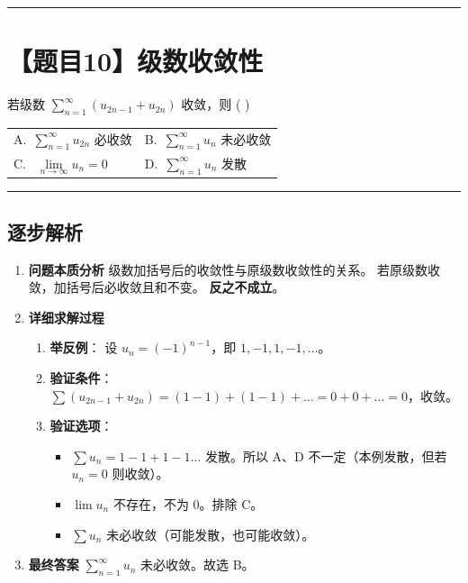 \documentclass[UTF8,10pt]{ctexart}
\makeatletter
\newenvironment{redenv}{\color{red}}{}
\newenvironment{detailedanalysis}{%
    \color{red}
    \begin{enumerate}[label=\textbf{第\arabic*步：}, leftmargin=*, align=left, itemsep=0pt, parsep=0pt, topsep=0pt, partopsep=0pt]
}{%
    \end{enumerate}
}
\newcommand{\problemrule}{\par\filbreak\noindent\rule{\textwidth}{1.5pt}\vspace{-0.5em}}
\newcommand{\analysisrule}{\noindent\rule{\textwidth}{0.8pt}\vspace{-0.5em}}
\newcommand{\twochoices}[4]{
    \par\noindent
    \begin{tabular*}{\linewidth}{@{\extracolsep{\fill}}ll}
        A.~#1 & B.~#2 \\
        C.~#3 & D.~#4
    \end{tabular*}
}
\makeatother
\begin{document}
\problemrule
\section*{【题目10】级数收敛性}
若级数 $\sum\limits_{n=1}^{\infty} (u_{2n-1} + u_{2n})$ 收敛，则 ( \quad )
\twochoices{$\sum\limits_{n=1}^{\infty} u_{2n}$ 必收敛}{$\sum\limits_{n=1}^{\infty} u_n$ 未必收敛}{ $\lim\limits_{n \to \infty} u_n = 0$}{$\sum\limits_{n=1}^{\infty} u_n$ 发散}

\begin{redenv}
\analysisrule
\subsection*{逐步解析}

\begin{detailedanalysis}
\item \textbf{问题本质分析}
级数加括号后的收敛性与原级数收敛性的关系。
若原级数收敛，加括号后必收敛且和不变。
\textbf{反之不成立}。

\item \textbf{详细求解过程}
\begin{enumerate}[label=(\alph*)]
    \item \textbf{举反例}：
    设 $u_n = (-1)^{n-1}$，即 $1, -1, 1, -1, \dots$。
    \item \textbf{验证条件}：
    $\sum (u_{2n-1} + u_{2n}) = (1-1) + (1-1) + \dots = 0 + 0 + \dots = 0$，收敛。
    \item \textbf{验证选项}：
    \begin{itemize}
        \item $\sum u_n = 1-1+1-1\dots$ 发散。所以 A、D 不一定（本例发散，但若 $u_n=0$ 则收敛）。
        \item $\lim u_n$ 不存在，不为 0。排除 C。
        \item $\sum u_n$ 未必收敛（可能发散，也可能收敛）。
    \end{itemize}
\end{enumerate}

\item \textbf{最终答案}
$\sum\limits_{n=1}^{\infty} u_n$ 未必收敛。故选 B。
\end{detailedanalysis}


\end{redenv}
\end{document}
